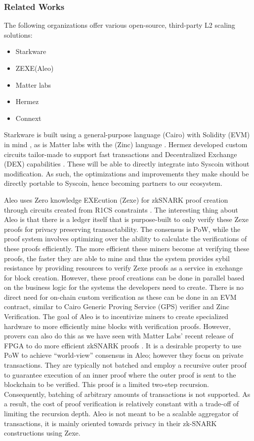 \documentclass[peerreview]{ieeesyscoin}
\begin{document}
\subsubsection{Related Works}

The following organizations offer various open-source, third-party L2 scaling solutions:

\begin{itemize}
\item Starkware 
\item ZEXE(Aleo) 
\item Matter labs 
\item Hermez
\item Connext 
\end{itemize}

Starkware is built using a general-purpose language (Cairo) with Solidity (EVM) in mind \cite{Sta20b}, as is Matter labs with the (Zinc) language \cite{matter21}. Hermez developed custom circuits tailor-made to support fast transactions and Decentralized Exchange (DEX) capabilities \cite{hermez21}. These will be able to directly integrate into Syscoin without modification. As such, the optimizations and improvements they make should be directly portable to Syscoin, hence becoming partners to our ecosystem.

Aleo uses Zero knowledge EXEcution (Zexe) for zkSNARK proof creation through circuits created from R1CS constraints \cite{aleo21}. The interesting thing about Aleo is that there is a ledger itself that is purpose-built to only verify these Zexe proofs for privacy preserving transactability. The consensus is PoW, while the proof system involves optimizing over the ability to calculate the verifications of these proofs efficiently. The more efficient these miners become at verifying these proofs, the faster they are able to mine and thus the system provides sybil resistance by providing resources to verify Zexe proofs as a service in exchange for block creation. However, these proof creations can be done in parallel based on the business logic for the systems the developers need to create. There is no direct need for on-chain custom verification as these can be done in an EVM contract, similar to Cairo Generic Proving Service (GPS) verifier and Zinc Verification. The goal of Aleo is to incentivize miners to create specialized hardware to more efficiently mine blocks with verification proofs. However, provers can also do this as we have seen with Matter Labs’ recent release of FPGA to do more efficient zkSNARK proofs \cite{Glu20}. It is a desirable property to use PoW to achieve “world-view” consensus in Aleo; however they focus on private transactions. They are typically not batched and employ a recursive outer proof to guarantee execution of an inner proof where the outer proof is sent to the blockchain to be verified. This proof is a limited two-step recursion. Consequently, batching of arbitrary amounts of transactions is not supported. As a result, the cost of proof verification is relatively constant with a trade-off of limiting the recursion depth. Aleo is not meant to be a scalable aggregator of transactions, it is mainly oriented towards privacy in their zk-SNARK constructions using Zexe.
\end{document}
